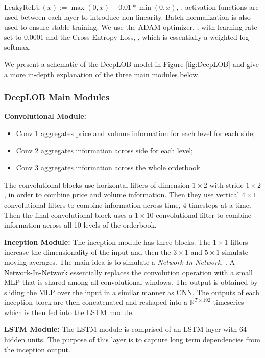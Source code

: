$\text{LeakyReLU}(x) := \max(0, x) + 0.01 * \min(0, x)$, \cite{MAAS2013}, activation functions are used between each layer to introduce non-linearity.
Batch normalization is also used to ensure stable training.
We use the ADAM optimizer, \cite{ADAM2017}, with learning rate set to $0.0001$ and the Cross Entropy Loss, \cite{CROSSENTROPYLOSS},
which is essentially a weighted log-softmax.

We present a schematic of the DeepLOB model in Figure \ref{fig:DeepLOB} and give a more in-depth explanation
of the three main modules below.
\clearpage

\subsubsection{DeepLOB Main Modules}
\begin{multicols}{2}
\textbf{Convolutional Module:}
 \begin{itemize}
    \item Conv 1 aggregates price and volume information for each level for each side;
    \item Conv 2 aggregates information across side for each level;
    \item Conv 3 aggregates information across the whole orderbook.
\end{itemize}
The convolutional blocks use horizontal filters of dimension $1 \times 2$ with stride $1 \times 2$, in order
to combine price and volume information. Then they use vertical $4 \times 1$ convolutional filters to combine
information across time, $4$ timesteps at a time. Then the final convolutional block uses a $1 \times 10$ convolutional
filter to combine information across all 10 levels of the orderbook.

\textbf{Inception Module:}
The inception module has three blocks. The $1 \times 1$ filters increase the dimensionality of
the input and then the $3 \times 1$ and $5 \times 1$ simulate moving averages.
The main idea is to simulate a \textit{Network-In-Network}, \cite{MIN2014}.
A Network-In-Network essentially replaces the convolution operation with a small MLP
that is shared among all convolutional windows. The output is obtained by sliding the MLP
over the input in a similar manner as CNN.
The outputs of each inception block are then concatenated and reshaped into a $\mathbb{R}^{T \times 192}$ timeseries
which is then fed into the LSTM module.

\textbf{LSTM Module:}
The LSTM module is comprised of an LSTM layer with 64 hidden units. The purpose
of this layer is to capture long term dependencies from the inception output.


\end{multicols}
